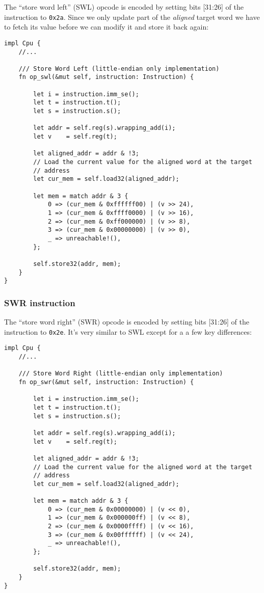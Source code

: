 \documentclass[a4paper]{article}
\newcommand{\code}[1] {\texttt{#1}}
\begin{document}
The ``store word left'' (SWL) opcode is encoded by setting bits
[31:26] of the instruction to \code{0x2a}. Since we only update part
of the \emph{aligned} target word we have to fetch its value before we
can modify it and store it back again:

\begin{lstlisting}
impl Cpu {
    //...

    /// Store Word Left (little-endian only implementation)
    fn op_swl(&mut self, instruction: Instruction) {

        let i = instruction.imm_se();
        let t = instruction.t();
        let s = instruction.s();

        let addr = self.reg(s).wrapping_add(i);
        let v    = self.reg(t);

        let aligned_addr = addr & !3;
        // Load the current value for the aligned word at the target
        // address
        let cur_mem = self.load32(aligned_addr);

        let mem = match addr & 3 {
            0 => (cur_mem & 0xffffff00) | (v >> 24),
            1 => (cur_mem & 0xffff0000) | (v >> 16),
            2 => (cur_mem & 0xff000000) | (v >> 8),
            3 => (cur_mem & 0x00000000) | (v >> 0),
            _ => unreachable!(),
        };

        self.store32(addr, mem);
    }
}
\end{lstlisting}

\subsubsection{SWR instruction}

The ``store word right'' (SWR) opcode is encoded by setting bits
[31:26] of the instruction to \code{0x2e}. It's very similar to SWL
except for a a few key differences:

\begin{lstlisting}
impl Cpu {
    //...

    /// Store Word Right (little-endian only implementation)
    fn op_swr(&mut self, instruction: Instruction) {

        let i = instruction.imm_se();
        let t = instruction.t();
        let s = instruction.s();

        let addr = self.reg(s).wrapping_add(i);
        let v    = self.reg(t);

        let aligned_addr = addr & !3;
        // Load the current value for the aligned word at the target
        // address
        let cur_mem = self.load32(aligned_addr);

        let mem = match addr & 3 {
            0 => (cur_mem & 0x00000000) | (v << 0),
            1 => (cur_mem & 0x000000ff) | (v << 8),
            2 => (cur_mem & 0x0000ffff) | (v << 16),
            3 => (cur_mem & 0x00ffffff) | (v << 24),
            _ => unreachable!(),
        };

        self.store32(addr, mem);
    }
}
\end{lstlisting}
\end{document}

